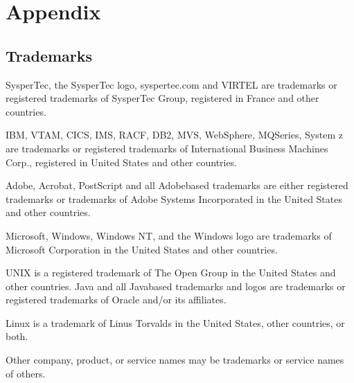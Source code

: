\documentclass[letterpaper,10pt,english]{sphinxmanual}
\begin{document}
\chapter{Appendix}
\label{\detokenize{Getting_Started:appendix}}

\section{Trademarks}
\label{\detokenize{Getting_Started:trademarks}}
\sphinxAtStartPar
SysperTec, the SysperTec logo, syspertec.com and VIRTEL are trademarks or registered trademarks of SysperTec
Group, registered in France and other countries.

\sphinxAtStartPar
IBM, VTAM, CICS, IMS, RACF, DB2, MVS, WebSphere, MQSeries, System z are trademarks or registered trademarks of
International Business Machines Corp., registered in United States and other countries.

\sphinxAtStartPar
Adobe, Acrobat, PostScript and all Adobe\sphinxhyphen{}based trademarks are either registered trademarks or trademarks of Adobe
Systems Incorporated in the United States and other countries.

\sphinxAtStartPar
Microsoft, Windows, Windows NT, and the Windows logo are trademarks of Microsoft Corporation in the United States
and other countries.

\sphinxAtStartPar
UNIX is a registered trademark of The Open Group in the United States and other countries.
Java and all Java\sphinxhyphen{}based trademarks and logos are trademarks or registered trademarks of Oracle and/or its affiliates.

\sphinxAtStartPar
Linux is a trademark of Linus Torvalds in the United States, other countries, or both.

\sphinxAtStartPar
Other company, product, or service names may be trademarks or service names of others.
\end{document}
